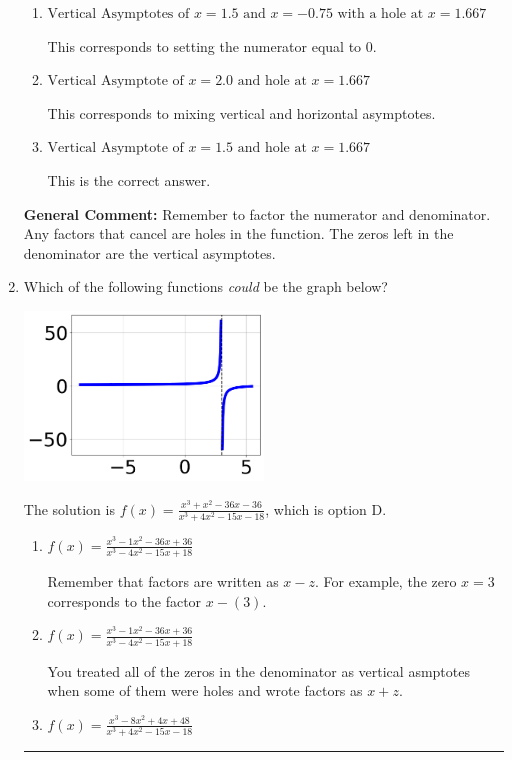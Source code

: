 \documentclass{extbook}[14pt]
\newcommand{\litem}[1]{\item #1

\rule{\textwidth}{0.4pt}}
\begin{document}
\begin{enumerate}
{\begin{enumerate}[label=\Alph*.]
This corresponds to considering where the denominator is equal to 0 as holes.
\item \( \text{Vertical Asymptotes of } x = 1.5 \text{ and } x = -0.75 \text{ with a hole at } x = 1.667 \)

This corresponds to setting the numerator equal to 0.
\item \( \text{Vertical Asymptote of } x = 2.0 \text{ and hole at } x = 1.667 \)

This corresponds to mixing vertical and horizontal asymptotes.
\item \( \text{Vertical Asymptote of } x = 1.5 \text{ and hole at } x = 1.667 \)

This is the correct answer.
\end{enumerate}

\textbf{General Comment:} Remember to factor the numerator and denominator. Any factors that cancel are holes in the function. The zeros left in the denominator are the vertical asymptotes.
}
\litem{
Which of the following functions \textit{could} be the graph below?

\begin{center}
    \includegraphics[width=0.5\textwidth]{../Figures/identifyGraphOfRationalFunctionA.png}
\end{center}


The solution is \( f(x)=\frac{x^{3} + x^{2} -36 x -36}{x^{3} +4 x^{2} -15 x -18} \), which is option D.\begin{enumerate}[label=\Alph*.]
\item \( f(x)=\frac{x^{3} -1 x^{2} -36 x + 36}{x^{3} -4 x^{2} -15 x + 18} \)

Remember that factors are written as $x-z$. For example, the zero $x=3$ corresponds to the factor $x-(3)$.
\item \( f(x)=\frac{x^{3} -1 x^{2} -36 x + 36}{x^{3} -4 x^{2} -15 x + 18} \)

You treated all of the zeros in the denominator as vertical asmptotes when some of them were holes and wrote factors as $x+z$.
\item \( f(x)=\frac{x^{3} -8 x^{2} +4 x + 48}{x^{3} +4 x^{2} -15 x -18} \)


\end{enumerate}}
\end{enumerate}
\end{document}
